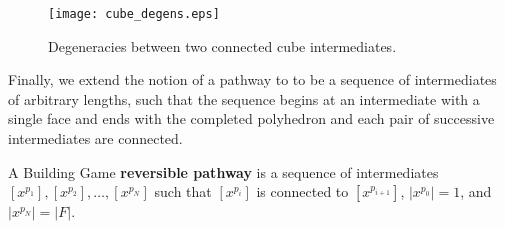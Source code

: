 \begin{figure}[ht]
\centering
\texttt{[image: cube\_degens.eps]}
\caption{Degeneracies between two connected cube intermediates.}
\label{fig:CubeDegen}    
\end{figure}


Finally, we extend the notion of a pathway to to be a sequence of intermediates of arbitrary lengths, such that the sequence begins at an intermediate with a single face and ends with the completed polyhedron and each pair of successive intermediates are connected.
\begin{mydef}
A Building Game \textbf{reversible pathway} is a sequence of intermediates $[x^{p_1}], [x^{p_2}], \dots, [x^{p_N}]$ such that  $[x^{p_i}]$ is connected to $[x^{p_{i+1}}]$, $|x^{p_0}| = 1$, and $|x^{p_N}| = |F|$.
\end{mydef}


%
%
%
%



